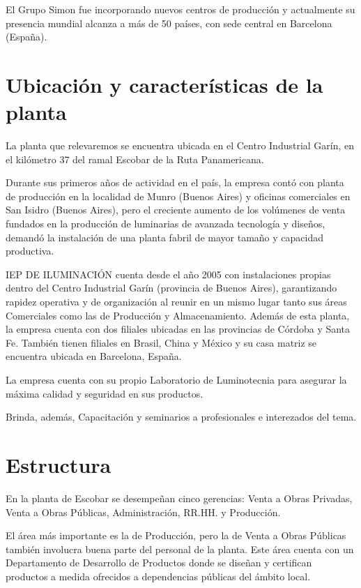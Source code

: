 \documentclass[12pt,titlepage]{article}
\begin{document}
El Grupo Simon fue incorporando nuevos centros de producci\'on y actualmente su presencia mundial alcanza a m\'as de 50 pa\'ises, con sede central en Barcelona (Espa\~na).

\section{Ubicaci\'on y caracter\'isticas de la planta}
La planta que relevaremos se encuentra ubicada en el Centro Industrial Gar\'in, en el kil\'ometro 37 del ramal Escobar de la Ruta Panamericana.

Durante sus primeros a\~nos de actividad en el pa\'is, la empresa cont\'o con planta de producci\'on en la localidad de Munro (Buenos Aires) y oficinas comerciales en San Isidro (Buenos Aires), pero el creciente aumento de los vol\'umenes de venta fundados en la producci\'on de luminarias de avanzada tecnolog\'ia y dise\~nos, demand\'o la instalaci\'on de una planta fabril de mayor tama\~no y capacidad productiva.

IEP DE ILUMINACI\'ON cuenta desde el a\~no 2005 con instalaciones propias dentro del Centro Industrial Gar\'in (provincia de Buenos Aires), garantizando rapidez operativa y de organizaci\'on al reunir en un mismo lugar tanto sus \'areas Comerciales como las de Producci\'on y Almacenamiento. Adem\'as de esta planta, la empresa cuenta con dos filiales ubicadas en las provincias de C\'ordoba y Santa Fe. También tienen filiales en Brasil, China y México y su casa matriz se encuentra ubicada en Barcelona, España.

La empresa cuenta con su propio Laboratorio de Luminotecnia para asegurar la m\'axima calidad y seguridad en sus productos.

Brinda, adem\'as, Capacitaci\'on y seminarios a profesionales e interezados del tema.

\section{Estructura}
En la planta de Escobar se desempe\~nan cinco gerencias: Venta a Obras Privadas, Venta a Obras P\'ublicas, Administraci\'on, RR.HH. y Producci\'on.

El \'area m\'as importante es la de Producci\'on, pero la de Venta a Obras P\'ublicas tambi\'en involucra buena parte del personal de la planta. Este \'area cuenta con un Departamento de Desarrollo de Productos donde se dise\~nan y certifican productos a medida ofrecidos a dependencias p\'ublicas del \'ambito local.
\end{document}
